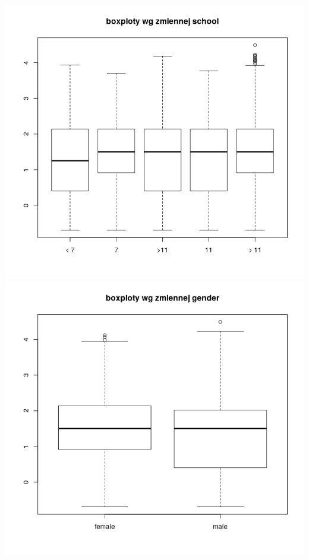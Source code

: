 \documentclass[a4paper,11pt]{article}
\begin{document}
\includegraphics[scale=.45]{Rplot4.png} 
\includegraphics[scale=.45]{Rplot5.png}
 
\end{document}
